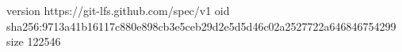 version https://git-lfs.github.com/spec/v1
oid sha256:9713a41b16117c880e898cb3e5ceb29d2e5d5d46c02a2527722a646846754299
size 122546
